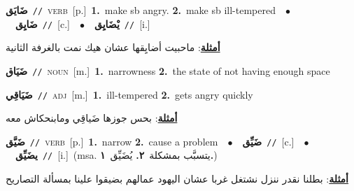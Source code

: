 \documentclass[10pt,a4paper,twoside]{article} %
\begin{document}
\begin{multicols}{2}
{\setlength\topsep{0pt}\textbf{\foreignlanguage{arabic}{ضَايَق}}\ {\color{gray}\texttt{//}\color{black}}\ \textsc{verb}\ [p.]\ \textbf{1.}~make sb angry.  \textbf{2.}~make sb ill-tempered\ \ $\bullet$\ \ \setlength\topsep{0pt}\textbf{\foreignlanguage{arabic}{ضَايِق}}\ {\color{gray}\texttt{//}\color{black}}\ [c.]\ \ $\bullet$\ \ \setlength\topsep{0pt}\textbf{\foreignlanguage{arabic}{يْضَايِق}}\ {\color{gray}\texttt{//}\color{black}}\ [i.]\  \begin{flushright}\color{gray}\foreignlanguage{arabic}{\textbf{\underline{\foreignlanguage{arabic}{أمثلة}}}: ماحبيت أضايِقها عشان هيك نمت بالغرفة الثانية}\end{flushright}\color{black}} \vspace{2mm}

{\setlength\topsep{0pt}\textbf{\foreignlanguage{arabic}{ضَيَاق}}\ {\color{gray}\texttt{//}\color{black}}\ \textsc{noun}\ [m.]\ \textbf{1.}~narrowness  \textbf{2.}~the state of not having enough space\ } \vspace{2mm}

{\setlength\topsep{0pt}\textbf{\foreignlanguage{arabic}{ضَيَاقِي}}\ {\color{gray}\texttt{//}\color{black}}\ \textsc{adj}\ [m.]\ \textbf{1.}~ill-tempered  \textbf{2.}~gets angry quickly\  \begin{flushright}\color{gray}\foreignlanguage{arabic}{\textbf{\underline{\foreignlanguage{arabic}{أمثلة}}}: بحس جوزها ضَياقِي ومابنحكاش معه}\end{flushright}\color{black}} \vspace{2mm}

{\setlength\topsep{0pt}\textbf{\foreignlanguage{arabic}{ضَيَّق}}\ {\color{gray}\texttt{//}\color{black}}\ \textsc{verb}\ [p.]\ \textbf{1.}~narrow  \textbf{2.}~cause a problem\ \ $\bullet$\ \ \setlength\topsep{0pt}\textbf{\foreignlanguage{arabic}{ضَيِّق}}\ {\color{gray}\texttt{//}\color{black}}\ [c.]\ \ $\bullet$\ \ \setlength\topsep{0pt}\textbf{\foreignlanguage{arabic}{يضَيِّق}}\ {\color{gray}\texttt{//}\color{black}}\ [i.]\ \color{gray}(msa. \foreignlanguage{arabic}{يتسبَّب بمشكلة}~\foreignlanguage{arabic}{\textbf{٢.}}  \foreignlanguage{arabic}{يُضَيِّق}~\foreignlanguage{arabic}{\textbf{١.}})\color{black}\  \begin{flushright}\color{gray}\foreignlanguage{arabic}{\textbf{\underline{\foreignlanguage{arabic}{أمثلة}}}: بطلنا نقدر ننزل نشتغل غربا عشان اليهود عمالهم بضيقوا علينا بمسألة التصاريح}\end{flushright}\color{black}} \vspace{2mm}


\end{multicols}
\end{document}
